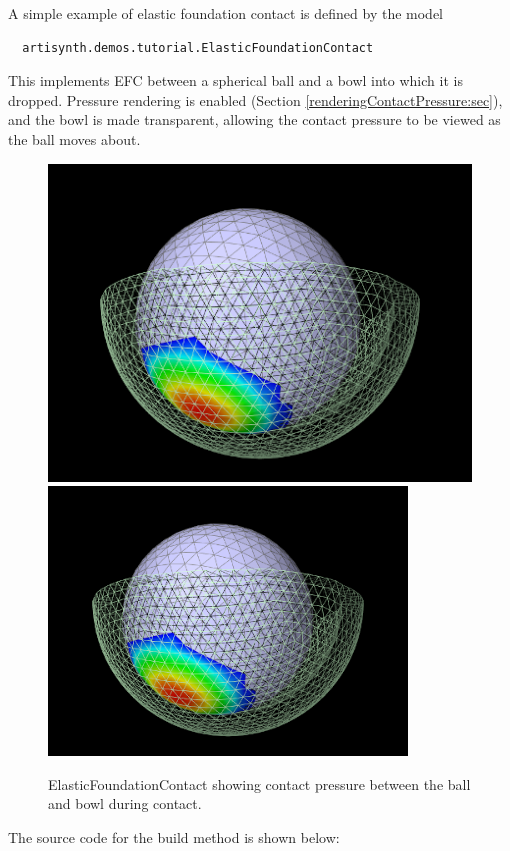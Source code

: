 A simple example of elastic foundation contact is defined by the model
%
\begin{verbatim}
  artisynth.demos.tutorial.ElasticFoundationContact
\end{verbatim}
%
This implements EFC between a spherical ball and a bowl into which it
is dropped. Pressure rendering is enabled
(Section \ref{renderingContactPressure:sec}), and the bowl is made
transparent, allowing the contact pressure to be viewed as the ball
moves about.

\begin{figure}[ht]
\begin{center}
\iflatexml
 \includegraphics[]{images/ElasticFoundationContact}
\else
 \includegraphics[width=3.75in]{images/ElasticFoundationContact}
\fi
\end{center}
\caption{ElasticFoundationContact showing contact pressure between
the ball and bowl during contact.}
\label{ElasticFoundationContact:fig}
\end{figure}

The source code for the build method is shown below:

